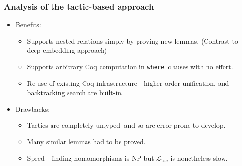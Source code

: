 \documentclass{beamer}
\newcommand{\WHERE}{{\tt where}\relax\ifmmode\ \else\xspace\fi}
\newcommand{\ltac}[0]{\ensuremath{\mathcal{L}_{\mathrm{tac}}}}
\begin{document}
\begin{frame}[fragile]
\frametitle{Analysis of the tactic-based approach}

\begin{itemize}
\item Benefits: 
\begin{itemize}
\item Supports nested relations simply by proving new lemmas. (Contrast to deep-embedding approach)
\item Supports arbitrary Coq computation in \WHERE clauses with no effort.
\item Re-use of existing Coq infrastructure - higher-order unification, and backtracking search are built-in.
\end{itemize}
\vspace{.2in}
\item Drawbacks:
\begin{itemize}
\item Tactics are completely untyped, and so are error-prone to develop.
\item Many similar lemmas had to be proved.
\item Speed - finding homomorphisms is NP but \ltac{} is nonetheless slow.
\end{itemize}

\end{itemize}
\end{frame}
\end{document}
